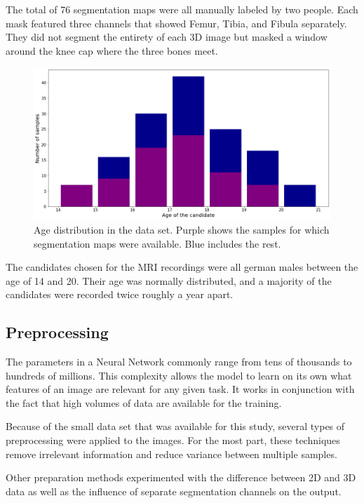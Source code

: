 The total of 76 segmentation maps were all manually labeled by two people. Each mask featured three channels that showed Femur, Tibia, and Fibula separately. They did not segment the entirety of each 3D image but masked a window around the knee cap where the three bones meet.

\begin{figure}[H]
\centering
\par
\includegraphics[width=1.0\textwidth]{imgs/age_distr.png}
\caption{Age distribution in the data set. Purple shows the samples for which segmentation maps were available. Blue includes the rest.}
\par
\end{figure}

The candidates chosen for the MRI recordings were all german males between the age of 14 and 20. Their age was normally distributed, and a majority of the candidates were recorded twice roughly a year apart.

\subsection{Preprocessing}

The parameters in a Neural Network commonly range from tens of thousands to hundreds of millions. This complexity allows the model to learn on its own what features of an image are relevant for any given task. It works in conjunction with the fact that high volumes of data are available for the training.

Because of the small data set that was available for this study, several types of preprocessing were applied to the images. For the most part, these techniques remove irrelevant information and reduce variance between multiple samples.

Other preparation methods experimented with the difference between 2D and 3D data as well as the influence of separate segmentation channels on the output.

